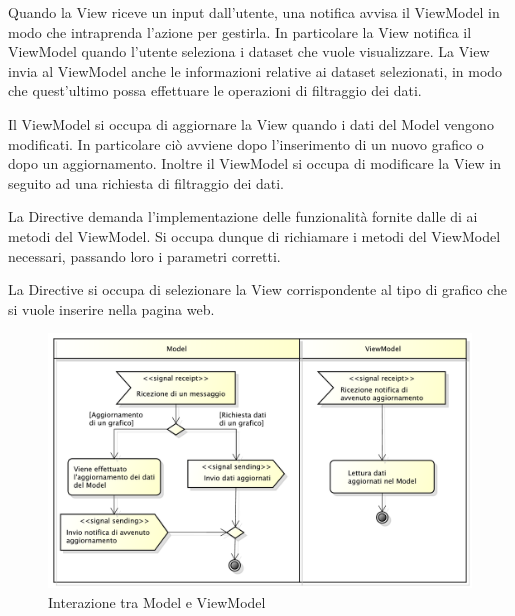 			Quando la View riceve un input dall'utente, una notifica avvisa il ViewModel in modo che intraprenda l'azione per gestirla. In particolare la View notifica il ViewModel quando l'utente seleziona i dataset che vuole visualizzare. La View invia al ViewModel anche le informazioni relative ai dataset selezionati, in modo che quest'ultimo possa effettuare le operazioni di filtraggio dei dati.
			
			Il ViewModel si occupa di aggiornare la View quando i dati del Model vengono modificati. In particolare ciò avviene dopo l'inserimento di un nuovo grafico o dopo un aggiornamento. Inoltre il ViewModel si occupa di modificare la View in seguito ad una richiesta di filtraggio dei dati.
				
			La Directive demanda l'implementazione delle funzionalità fornite dalle  di  ai metodi del ViewModel. Si occupa dunque di richiamare i metodi del ViewModel necessari, passando loro i parametri corretti.
			
			La Directive si occupa di selezionare la View corrispondente al tipo di grafico che si vuole inserire nella pagina web.
			\begin{figure}[H]\centering
	        		\includegraphics[width=\textwidth]{SpecificaTecnica/Pics/Model-ViewModel}
	        		\caption{Interazione tra Model e ViewModel}
	    		\end{figure}
	    		
